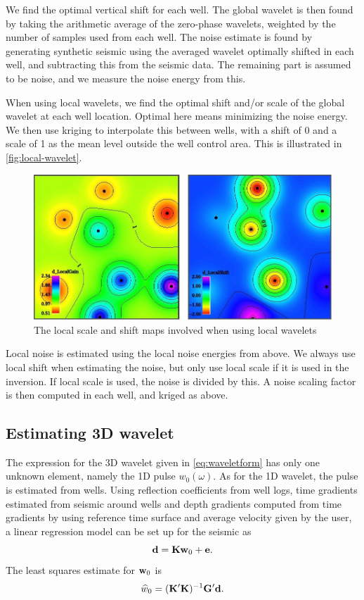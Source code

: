 We find the optimal vertical shift for each well. The global wavelet is then found by taking the arithmetic average of the zero-phase wavelets, weighted by the number of samples used from each well. The noise estimate is found by generating synthetic seismic using the averaged wavelet optimally shifted in each well, and subtracting this from the seismic data. The remaining part is assumed to be noise, and we measure the noise energy from this.

When using local wavelets, we find the optimal shift and/or scale of
the global wavelet at each well location. Optimal here means
minimizing the noise energy. We then use kriging to interpolate this
between wells, with a shift of 0 and a scale of 1 as the mean level
outside the well control area.  This is illustrated in
\autoref{fig:local-wavelet}. 

\begin{figure}
  \centering
  \includegraphics[width=.95\linewidth]{images/local-wavelet}
  \caption{The local scale and shift maps involved when using local wavelets}
  \label{fig:local-wavelet}
\end{figure}

Local noise is estimated using the local noise energies from above. We always use local shift when estimating the noise, but only use local scale if it is used in the inversion. If local scale is used, the noise is divided by this. A noise scaling factor is then computed in each well, and kriged as above.

\subsection{Estimating 3D wavelet}
\label{sec:3Dwaveestimp}
The expression for the 3D wavelet given in \autoref{eq:waveletform} has only one unknown element, namely the 1D pulse $w_0(\omega)$. As for the 1D wavelet, the pulse is estimated from wells. Using reflection coefficients from well logs, time gradients estimated from seismic around wells and depth gradients computed from time gradients by using reference time surface and average velocity given by the user, a linear regression model can be set up for the seismic as
\begin{equation}
\mathbf{d} = \mathbf{K}\mathbf{w}_0 + \mathbf{e}.
\end{equation}
The least squares estimate for $\mathbf{w}_0$ is
\begin{equation}
\widehat{w}_0 = (\mathbf{K}'\mathbf{K})^{-1}\mathbf{G}'\mathbf{d}.
\end{equation}


